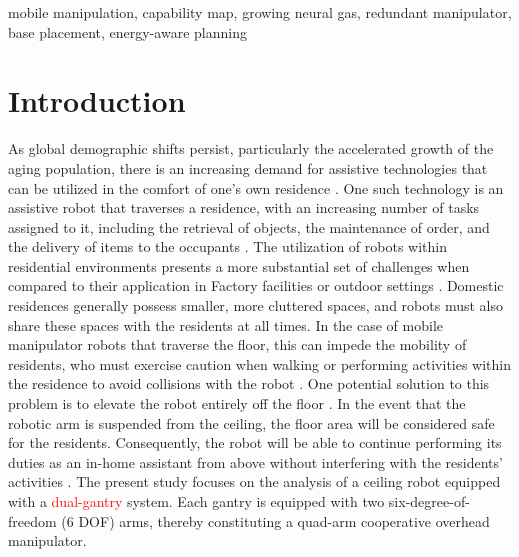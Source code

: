 \documentclass[conference]{IEEEtran}
\begin{document}
\begin{IEEEkeywords}
mobile manipulation, capability map, growing neural gas, redundant manipulator,
base placement, energy-aware planning
\end{IEEEkeywords}

\section{Introduction}

As global demographic shifts persist, particularly the accelerated growth of the aging population, 
there is an increasing demand for assistive technologies that can be utilized in 
the comfort of one's own residence \cite{unitednations2024world,who2025clinical}. 
One such technology is an assistive robot that traverses a residence, with an 
increasing number of tasks assigned to it, including the retrieval of objects, 
the maintenance of order, and the delivery of items to the occupants \cite{IFR2025,Lisondra2025}. 
The utilization of robots within residential environments presents a more substantial 
set of challenges when compared to their application in Factory facilities or outdoor settings \cite{kemp2007challenges}. 
Domestic residences generally possess smaller, more cluttered spaces, 
and robots must also share these spaces with the residents at all times. 
In the case of mobile manipulator robots that traverse the floor, this can impede 
the mobility of residents, who must exercise caution when walking or performing 
activities within the residence to avoid collisions with the robot \cite{sisbot2007human}. 
One potential solution to this problem is to elevate the robot entirely off the floor \cite{toyama2002development}. 
In the event that the robotic arm is suspended from the ceiling, 
the floor area will be considered safe for the residents. 
Consequently, the robot will be able to continue performing its duties 
as an in-home assistant from above without interfering with the residents' activities \cite{Jayathilaka2025}. 
The present study focuses on the analysis of a ceiling robot equipped with a \textcolor{red}{dual-gantry} system.
Each gantry is equipped with two six-degree-of-freedom (6 DOF) arms, 
thereby constituting a quad-arm cooperative overhead manipulator.
\end{document}
